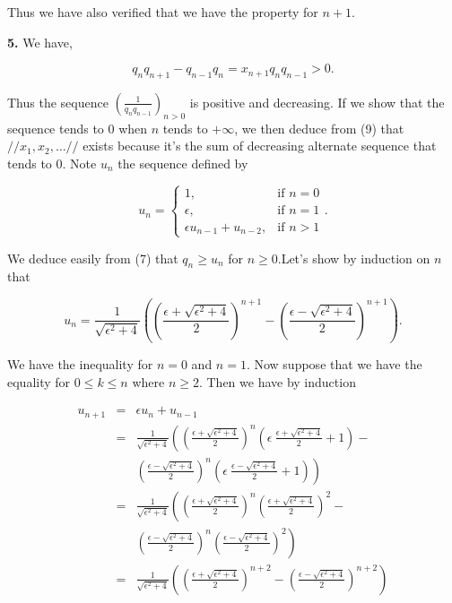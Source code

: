 \documentclass[a4paper,12pt]{article}
\newcommand{\newpar}[1]{\bigskip \noindent \textbf{#1.}}
\begin{document}
Thus we have also verified that we have the property for $n+1$.

\newpar{5} We have,

\[ q_n q_{n+1} - q_{n-1} q_n = x_{n+1} q_n q_{n-1} > 0.\]

Thus the sequence $\left(\frac{1}{q_nq_{n-1}}\right)_{n>0}$ is positive
and decreasing.  If we show that the sequence tends to $0$ when $n$
tends to $+\infty$, we then deduce from (9) that $//x_1,x_2,\ldots//$
exists because it's the sum of decreasing alternate sequence that tends
to $0$.  Note $u_n$ the sequence defined by

\[
u_n = \left\{
\begin{array}{ll}
  1,&\mbox{if $n=0$} \\
  \epsilon,&\mbox{if $n=1$} \\
  \epsilon u_{n-1} + u_{n-2},&\mbox{if $n>1$}
\end{array}
\right.
.\]

We deduce easily from (7) that $q_n \ge u_n$ for $n\ge0$.Let's show by
induction on $n$ that

\[ u_n = \frac{1}{\sqrt{\epsilon^2+4}}\left(\left(\frac{\epsilon +
  \sqrt{\epsilon^2 + 4}}{2}\right)^{n+1} -
\left(\frac{\epsilon - \sqrt{\epsilon^2 + 4}}{2}\right)^{n+1}\right) .\]

We have the inequality for $n=0$ and $n=1$.  Now suppose that we have
the equality for $0\le k\le n$ where $n\ge 2$.  Then we have by
induction

\begin{eqnarray*}
  u_{n+1} &=& \epsilon u_n + u_{n-1} \\
  &=& \frac{1}{\sqrt{\epsilon^2+4}}\left(
  \left(\frac{\epsilon + \sqrt{\epsilon^2 + 4}}{2} \right)^n
  \left(\epsilon\ \frac{\epsilon + \sqrt{\epsilon^2+4}}{2} + 1 \right)
  -\right.\\
  && \left.\left(\frac{\epsilon - \sqrt{\epsilon^2 + 4}}{2} \right)^n
  \left(\epsilon\ \frac{\epsilon - \sqrt{\epsilon^2+4}}{2} + 1 \right)
  \right) \\
  &=& \frac{1}{\sqrt{\epsilon^2+4}}\left(
  \left(\frac{\epsilon + \sqrt{\epsilon^2 + 4}}{2} \right)^n
  \left(\frac{\epsilon + \sqrt{\epsilon^2+4}}{2}\right)^2
  -\right.\\
  && \left.\left(\frac{\epsilon - \sqrt{\epsilon^2 + 4}}{2} \right)^n
  \left(\frac{\epsilon - \sqrt{\epsilon^2+4}}{2}\right)^2
  \right) \\
  &=& \frac{1}{\sqrt{\epsilon^2+4}}\left(\left(\frac{\epsilon +
  \sqrt{\epsilon^2 + 4}}{2}\right)^{n+2} -
\left(\frac{\epsilon - \sqrt{\epsilon^2 + 4}}{2}\right)^{n+2}\right)
\end{eqnarray*}
\end{document}
